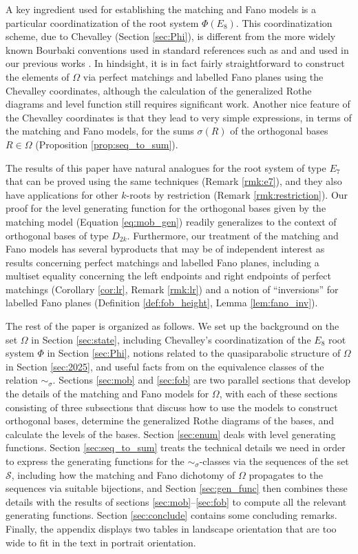 \documentclass[11pt]{amsart}
\theoremstyle{plain}
\theoremstyle{definition}
\theoremstyle{remark}
\numberwithin{equation}{section}
\newcommand{\cals}{\mathcal{S}}
\newcommand{\ob}{\Omega}
\begin{document}
A key ingredient used for establishing the matching and Fano models is a
particular coordinatization of the root system $\Phi(E_8)$. This
coordinatization scheme,  due to Chevalley \cite[4.VII]{chevalley} (Section
\ref{sec:Phi}), is different from the more widely known Bourbaki conventions
used in standard references such as \cite{bourbaki} and \cite{humphreys90} and
used in our previous works \cite{gx5,gx6}. In hindsight, it is in fact fairly
straightforward to construct the elements of $\ob$ via perfect matchings and
labelled Fano planes using the Chevalley coordinates, although the calculation
of the generalized Rothe diagrams and level function still requires significant
work. Another nice feature of the Chevalley coordinates is that they lead to
very simple expressions, in terms of the matching and Fano models, for the sums
$\sigma(R)$ of the orthogonal bases $R\in \ob$ (Proposition
\ref{prop:seq_to_sum}).

The results of this paper have natural analogues for the root system of type
$E_7$ that can be proved using the same techniques (Remark \ref{rmk:e7}),  and
they also have applications for other $k$-roots by restriction (Remark
\ref{rmk:restriction}). Our proof for the level
generating function for the orthogonal bases given by the matching model
(Equation \eqref{eq:mob_gen}) readily generalizes to the context of orthogonal
bases of type $D_{2k}$. Furthermore, our
treatment of the matching and Fano models has several byproducts that may be of
independent interest as results concerning perfect matchings and labelled Fano
planes, including a multiset equality concerning the left endpoints and right
endpoints of  perfect matchings (Corollary \ref{cor:lr}, Remark \ref{rmk:lr})
and a notion of ``inversions'' for labelled Fano planes (Definition
\ref{def:fob_height}, Lemma \ref{lem:fano_inv}).

The rest of the paper is organized as follows. We set up the background on the
set $\ob$ in Section \ref{sec:state}, including Chevalley's coordinatization of
the $E_8$ root system $\Phi$ in Section \ref{sec:Phi}, notions related to the
quasiparabolic structure of $\ob$ in Section \ref{sec:2025}, and useful facts
from \cite{gx5} on the equivalence classes of the relation $\sim_\sigma$.
Sections \ref{sec:mob} and \ref{sec:fob} are two parallel sections that develop
the details of the matching and Fano models for $\ob$, with each of these
sections consisting of three subsections that discuss how to use the  models to
construct orthogonal bases, determine the generalized Rothe diagrams of the
bases, and calculate the levels of the bases. Section \ref{sec:enum} deals with
level generating functions. Section \ref{sec:seq_to_sum} treats the technical
details we need in order to express the generating functions for the
$\sim_\sigma$-classes via the sequences of the set $\cals$, including how the
matching and Fano dichotomy of $\ob$ propagates to the sequences via suitable
bijections, and Section \ref{sec:gen_func} then combines these details with the
results of sections \ref{sec:mob}--\ref{sec:fob} to compute all the relevant
generating functions. Section \ref{sec:conclude} contains some concluding
remarks. Finally, the appendix displays two tables in landscape orientation that
are too wide to fit in the text in portrait orientation.
\end{document}
